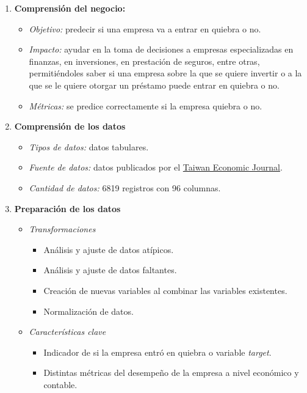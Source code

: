 \documentclass[
11pt, %
]{charter}
\begin{document}
\begin{enumerate}
  \item \textbf{Comprensión del negocio:}
    \begin{itemize}
        \item \textit{Objetivo:} predecir si una empresa va a entrar en quiebra o no.
        \item \textit{Impacto:} ayudar en la toma de decisiones a empresas especializadas en finanzas, en inversiones, en prestación de seguros, entre otras, permitiéndoles saber si una empresa sobre la que se quiere invertir o a la que se le quiere otorgar un préstamo puede entrar en quiebra o no.
        \item \textit{Métricas:} se predice correctamente si la empresa quiebra o no.
    \end{itemize}
  \item \textbf{Comprensión de los datos}
    \begin{itemize}
        \item \textit{Tipos de datos:} datos tabulares.
        \item \textit{Fuente de datos:} datos publicados por el \href{https://www.tejwin.com/en/}{Taiwan Economic Journal}.
        \item \textit{Cantidad de datos:} 6819 registros con 96 columnas.
    \end{itemize}
  \item \textbf{Preparación de los datos}
    \begin{itemize}
        \item \textit{Transformaciones}
            \begin{itemize}
                \item Análisis y ajuste de datos atípicos.
                \item Análisis y ajuste de datos faltantes.
                \item Creación de nuevas variables al combinar las variables existentes.
                \item Normalización de datos.
            \end{itemize}
        \item \textit{Características clave}
            \begin{itemize}
                \item Indicador de si la empresa entró en quiebra o variable \textit{target}.
                \item Distintas métricas del desempeño de la empresa a nivel económico y contable.

\end{itemize}
\end{itemize}
\end{enumerate}
\end{document}

